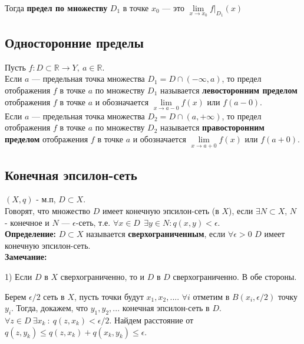 Тогда \textbf{предел по множеству} $D_1$ в точке $x_0$ --- это $\lim\limits_{x\to x_0} f|_{D_1}(x)$ %

\newpage
\subsection{Односторонние пределы}

Пусть $ f: D \subset \mathbb{R} \to Y, \ a \in \mathbb{R} $. \\


Если $a$ {{---}} предельная точка множества $ D_1 = D \cap \left ( - \infty, a \right ) $, то предел отображения $f$ в точке $a$ по множеству $D_1$ называется \textbf{левосторонним пределом} отображения $f$ в точке $a$ и обозначается $\underset{x \to a-0}{\lim} f(x) $ или $f(a-0)$. \\


Если $a$ {{---}} предельная точка множества $D_2 = D \cap \left ( a, + \infty \right ) $, то предел отображения $f$ в точке $a$ по множеству $D_2$ называется \textbf{правосторонним пределом} отображения $f$ в точке $a$ и обозначается $\underset{x \to a+0}{\lim} f(x)$ или $f(a+0) $.

\newpage
\subsection{Конечная эпсилон-сеть}
$(X, q)$ - м.п, $D \subset X$. \\


Говорят, что множество $D$ имеет конечную эпсилон-сеть (в $X$), если $\exists N \subset X$, $N$ - конечное и $N$ {{---}} $\epsilon$-сеть, т.е. $\forall x \in D \ \ \exists y \in N : q(x, y) < \epsilon$. \\

\textbf{Определение:} $D \subset X$ называется \textbf{сверхограниченным}, если $\forall \epsilon > 0$ $D$ имеет конечную эпсилон-сеть. \\

\textbf{Замечание:}

1) Если $D$ в $X$ сверхограниченно, то и $D$ в $D$ сверхограниченно. В обе стороны.

Берем $\epsilon/2$ сеть в $X$, пусть точки будут $x_1, x_2, ...$. $\forall i$ отметим в $B(x_i, \epsilon/2)$ точку $y_i$. Тогда, докажем, что $y_1, y_2, ...$ конечная эпсилон-сеть в $D$. $\forall z \in D \ \exists x_k \: : \ q(z, x_k) < \epsilon/2$. Найдем расстояние от $q(z, y_k) \leq q(z, x_k) + q(x_k, y_k) \leq \epsilon$. 

